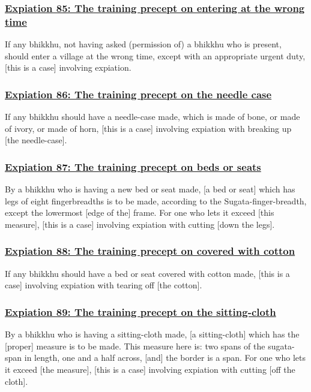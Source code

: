 \subsubsection*{\hyperref[pac85]{Expiation 85: The training precept on entering at the wrong time}}
\label{exp85}
If any bhikkhu, not having asked (permission of) a bhikkhu who is present, should enter a village at the wrong time, except with an appropriate urgent duty, [this is a case] involving expiation.

\subsubsection*{\hyperref[pac86]{Expiation 86: The training precept on the needle case}}
\label{exp86}
If any bhikkhu should have a needle-case made, which is made of bone, or made of ivory, or made of horn, [this is a case] involving expiation with breaking up [the needle-case].

\subsubsection*{\hyperref[pac87]{Expiation 87: The training precept on beds or seats}}
\label{exp87}
By a bhikkhu who is having a new bed or seat made, [a bed or seat] which has legs of eight fingerbreadths is to be made, according to the Sugata-finger-breadth, except the lowermost [edge of the] frame. For one who lets it exceed [this measure], [this is a case] involving expiation with cutting [down the legs].

\subsubsection*{\hyperref[pac88]{Expiation 88: The training precept on covered with cotton}}
\label{exp88}
If any bhikkhu should have a bed or seat covered with cotton made, [this is a case] involving expiation with tearing off [the cotton].

\subsubsection*{\hyperref[pac89]{Expiation 89: The training precept on the sitting-cloth}}
\label{exp89}
By a bhikkhu who is having a sitting-cloth made, [a sitting-cloth] which has the [proper] measure is to be made. This measure here is: two spans of the sugata-span in length, one and a half across, [and] the border is a span. For one who lets it exceed [the measure], [this is a case] involving expiation with cutting [off the cloth].

